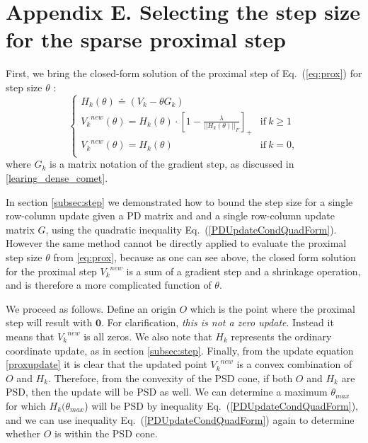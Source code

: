 \documentclass[twoside,11pt]{article}
\newcommand\mat[1]{{#1}}
\renewcommand\vec[1]{\mathbf{#1}}
\newcommand{\eqdef}{\doteq}
\newcommand{\Hk}{H_k}
\newcommand{\Vk}{\mat{V_k}}
\renewcommand{\eqref}[1]{Eq.~(\ref{#1})}
\begin{document}
\section*{Appendix E. Selecting the step size for the sparse proximal step}
First, we bring the closed-form solution of the proximal step of \eqref{eq:prox} for step size $\theta$ \citep{bach2012optimization}:
\begin{equation}\label{proxupdate}
 \begin{cases}
   H_k(\theta) \eqdef (V_k-\theta G_k) \\ 
   \Vk^{new} (\theta) = \Hk(\theta) \cdot [1 - \frac{\lambda}{||\Hk(\theta)||_F}]_+ & \text{if}\  k \geq 1\\
   \Vk^{new} (\theta) = \Hk(\theta) & \text{if}\ k = 0, \\ 
 \end{cases}
\end{equation}
where $G_k$ is a matrix notation of the gradient step, as discussed in \ref{learing_dense_comet}. 

In section \ref{subsec:step} we demonstrated how to bound the step size for a single row-column update given a PD matrix and and a single row-column update matrix $\mat{G}$, using the quadratic inequality \eqref{PDUpdateCondQuadForm}.
However the same method cannot be directly applied to evaluate the proximal step size $\theta$ from \ref{eq:prox}, because as one can see above, the closed form solution for the proximal step $\Vk^{new}$ is a sum of a gradient step and a shrinkage operation, and is therefore a more complicated function of $\theta$.

\newcommand{\Vkorigin}{\mat{O}}
We proceed as follows. Define an origin $\Vkorigin$ which is the point where the proximal step will result with $\vec{0}$. For clarification, \emph{this is not a zero update}. Instead it means that $\Vk^{new}$ is all zeros. We also note that $\Hk$ represents the ordinary coordinate update, as in section \ref{subsec:step}. Finally, from the update equation \ref{proxupdate} it is clear that the updated point $\Vk^{new}$ is a convex combination of $\Vkorigin$ and $\Hk$. Therefore, from the convexity of the PSD cone, if both $\Vkorigin$ and $\Hk$ are PSD, then the update will be PSD as well. We can determine a maximum $\theta_{max}$ for which $\Hk(\theta_{max}$) will be PSD by inequality \eqref{PDUpdateCondQuadForm}, and we can use inequality \eqref{PDUpdateCondQuadForm} again to determine whether $\Vkorigin$ is within the PSD cone.
\end{document}
